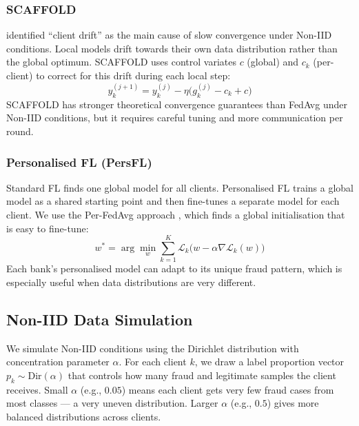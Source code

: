 \documentclass[12pt, a4paper]{article}
\begin{document}
\subsubsection{SCAFFOLD}

\citet{karimireddy2020} identified ``client drift'' as the main cause of slow convergence under Non-IID conditions. Local models drift towards their own data distribution rather than the global optimum. SCAFFOLD uses control variates $c$ (global) and $c_k$ (per-client) to correct for this drift during each local step:
\begin{equation}
    y_k^{(j+1)} = y_k^{(j)} - \eta \bigl(g_k^{(j)} - c_k + c\bigr)
    \label{eq:scaffold}
\end{equation}
SCAFFOLD has stronger theoretical convergence guarantees than FedAvg under Non-IID conditions, but it requires careful tuning and more communication per round.

\subsubsection{Personalised FL (PersFL)}

Standard FL finds one global model for all clients. Personalised FL trains a global model as a shared starting point and then fine-tunes a separate model for each client. We use the Per-FedAvg approach \citep{fallah2020personalized}, which finds a global initialisation that is easy to fine-tune:
\begin{equation}
    w^* = \arg\min_{w} \sum_{k=1}^{K} \mathcal{L}_k\bigl(w - \alpha \nabla \mathcal{L}_k(w)\bigr)
    \label{eq:persfl}
\end{equation}
Each bank's personalised model can adapt to its unique fraud pattern, which is especially useful when data distributions are very different.

\subsection{Non-IID Data Simulation}

We simulate Non-IID conditions using the Dirichlet distribution with concentration parameter $\alpha$. For each client $k$, we draw a label proportion vector $p_k \sim \text{Dir}(\alpha)$ that controls how many fraud and legitimate samples the client receives. Small $\alpha$ (e.g., $0.05$) means each client gets very few fraud cases from most classes --- a very uneven distribution. Larger $\alpha$ (e.g., $0.5$) gives more balanced distributions across clients.
\end{document}
